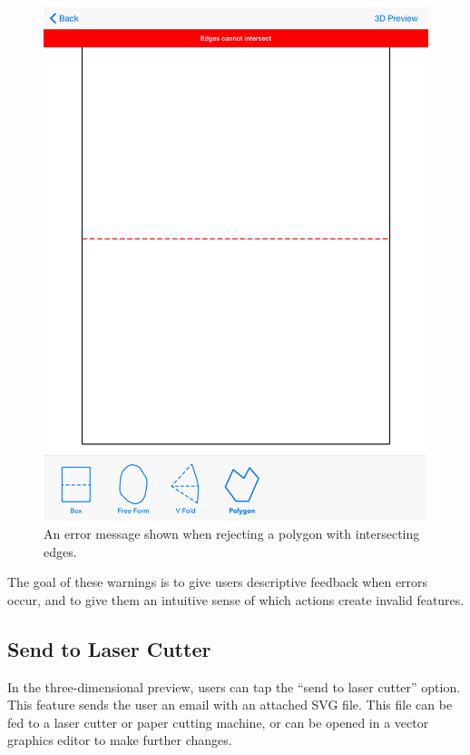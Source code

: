 \begin{figure}[htbp]
\centering
\includegraphics{figures/32_UI_Tool_Interactions/error_message.png}
\caption{An error message shown when rejecting a polygon with
intersecting edges.}
\end{figure}

The goal of these warnings is to give users descriptive feedback when
errors occur, and to give them an intuitive sense of which actions
create invalid features.

\subsection{Send to Laser Cutter}\label{send-to-laser-cutter}

In the three-dimensional preview, users can tap the ``send to laser
cutter'' option. This feature sends the user an email with an attached
SVG file. This file can be fed to a laser cutter or paper cutting
machine, or can be opened in a vector graphics editor to make further
changes.

